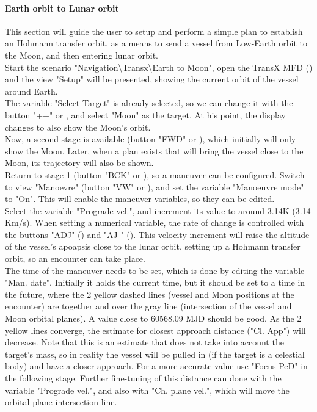 \documentclass[Orbiter User Manual.tex]{subfiles}
\begin{document}
\paragraph{Earth orbit to Lunar orbit}
This section will guide the user to setup and perform a simple plan to establish an Hohmann transfer orbit, as a means to send a vessel from Low-Earth orbit to the Moon, and then entering lunar orbit.\\
Start the scenario "Navigation\textbackslash Transx\textbackslash Earth to Moon", open the TransX MFD (\Shift{}) and the view "Setup" will be presented, showing the current orbit of the vessel around Earth.\\
The variable "Select Target" is already selected, so we can change it with the button "++" or \Shift\keystroke{=}, and select "Moon" as the target. At his point, the display changes to also show the Moon's orbit.\\
Now, a second stage is available (button "FWD" or \Shift{}), which initially will only show the Moon. Later, when a plan exists that will bring the vessel close to the Moon, its trajectory will also be shown.\\
Return to stage 1 (button "BCK" or \Shift{}), so a maneuver can be configured. Switch to view "Manoevre" (button "VW" or \Shift{}), and set the variable "Manoeuvre mode" to "On". This will enable the maneuver variables, so they can be edited.\\
Select the variable "Prograde vel.", and increment its value to around 3.14K (3.14 Km/s). When setting a numerical variable, the rate of change is controlled with the buttons "ADJ" (\Shift\keystroke{\{}) and "AJ-" (\Shift\keystroke{\}}). This velocity increment will raise the altitude of the vessel's apoapsis close to the lunar orbit, setting up a Hohmann transfer orbit, so an encounter can take place.\\
The time of the maneuver needs to be set, which is done by editing the variable "Man. date". Initially it holds the current time, but it should be set to a time in the future, where the 2 yellow dashed lines (vessel and Moon positions at the encounter) are together and over the gray line (intersection of the vessel and Moon orbital planes). A value close to 60568.09 MJD should be good. As the 2 yellow lines converge, the estimate for closest approach distance ("Cl. App") will decrease. Note that this is an estimate that does not take into account the target's mass, so in reality the vessel will be pulled in (if the target is a celestial body) and have a closer approach. For a more accurate value use "Focus PeD" in the following stage. Further fine-tuning of this distance can done with the variable "Prograde vel.", and also with "Ch. plane vel.", which will move the orbital plane intersection line.\\
\end{document}
